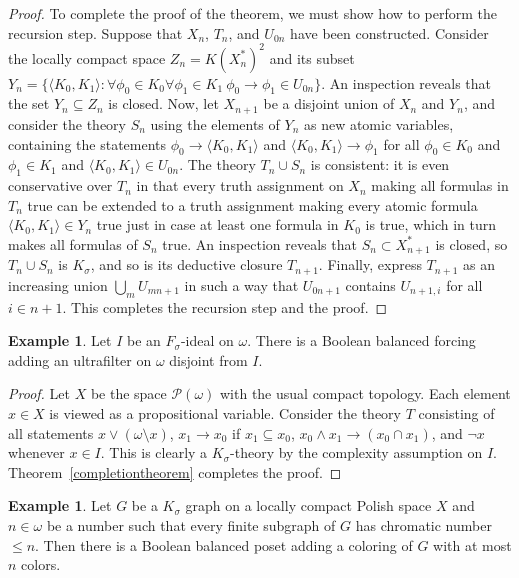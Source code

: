 \documentclass{article}
\newcommand{\gw}{\omega}
\newcommand{\gs}{\sigma}
\newcommand{\power}{\mathcal{P}}
\theoremstyle{definition}
\newtheorem{example}[theorem]{Example}
\begin{document}
\begin{proof}
To complete the proof of the theorem, we must show how to perform the recursion step. Suppose that $X_n$, $T_n$, and $U_{0n}$ have been constructed. Consider the locally compact space $Z_n=K(X^*_n)^2$ and its subset $Y_n=\{\langle K_0, K_1\rangle\colon \forall\phi_0\in K_0\forall \phi_1\in K_1\ \phi_0\to\phi_1\in U_{0n}\}$. An inspection reveals that the set $Y_n\subseteq Z_n$ is closed. Now, let $X_{n+1}$ be a disjoint union of $X_n$ and $Y_n$, and consider the theory $S_n$ using the elements of $Y_n$ as new atomic variables, containing the statements $\phi_0\to\langle K_0, K_1\rangle$ and $\langle K_0, K_1\rangle\to\phi_1$ for all $\phi_0\in K_0$ and $\phi_1\in K_1$ and $\langle K_0, K_1\rangle\in U_{0n}$. The theory $T_n\cup S_n$ is consistent: it is even conservative over $T_n$ in that every truth assignment on $X_n$ making all formulas in $T_n$ true can be extended to a truth assignment making every atomic formula $\langle K_0, K_1\rangle\in Y_n$ true just in case at least one formula in $K_0$ is true, which in turn makes all formulas of $S_n$ true. An inspection reveals that $S_n\subset X^*_{n+1}$ is closed, so $T_n\cup S_n$ is $K_\gs$, and so is its deductive closure $T_{n+1}$. Finally, express $T_{n+1}$ as an increasing union $\bigcup_mU_{mn+1}$ in such a way that $U_{0n+1}$ contains $U_{n+1,i}$ for all $i\in n+1$. This completes the recursion step and the proof.
\end{proof}


	
\begin{example}
\label{fsigmaexample}
	Let $I$ be an $F_\gs$-ideal on $\gw$. There is a Boolean balanced forcing adding an ultrafilter on $\gw$ disjoint from $I$.
\end{example}

\begin{proof}
	Let $X$ be the space $\power(\gw)$ with the usual compact topology. Each element $x\in X$ is viewed as a propositional variable. Consider the theory $T$ consisting of all statements $x\lor (\gw\setminus x)$, $x_1\to x_0$ if $x_1\subseteq x_0$, $x_0\land x_1\to (x_0\cap x_1)$, and $\lnot x$ whenever $x\in I$. This is clearly a $K_\gs$-theory by the complexity assumption on $I$. Theorem~\ref{completiontheorem} completes the proof.
\end{proof}

\begin{example}
	Let $G$ be a $K_\gs$ graph on a locally compact Polish space $X$ and $n\in\gw$ be a number such that every finite subgraph of $G$ has chromatic number $\leq n$. Then there is a Boolean balanced poset adding a coloring of $G$ with at most $n$ colors.
\end{example}
\end{document}
